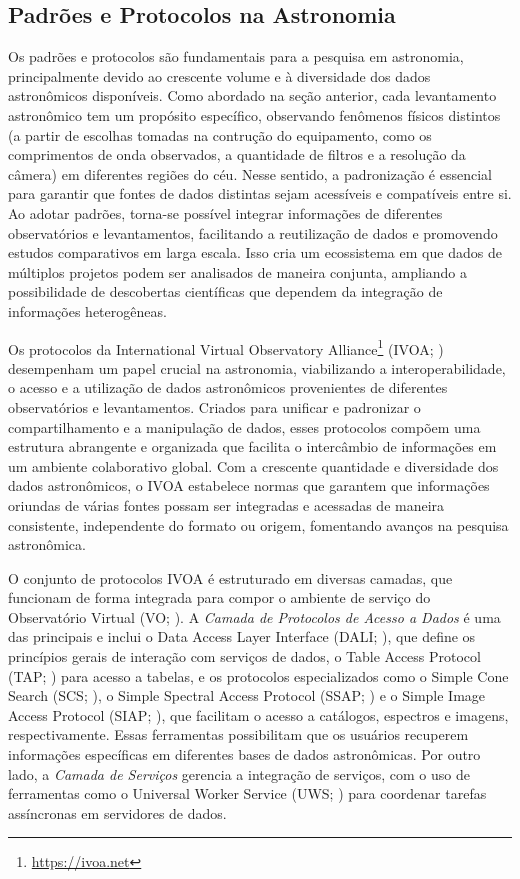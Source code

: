 \subsection{Padrões e Protocolos na Astronomia}
\label{sec:protocolos}

Os padrões e protocolos são fundamentais para a pesquisa em astronomia, principalmente devido ao crescente volume e à diversidade dos dados astronômicos disponíveis. Como abordado na seção anterior, cada levantamento astronômico tem um propósito específico, observando fenômenos físicos distintos (a partir de escolhas tomadas na contrução do equipamento, como os comprimentos de onda observados, a quantidade de filtros e a resolução da câmera) em diferentes regiões do céu. Nesse sentido, a padronização é essencial para garantir que  fontes de dados distintas sejam acessíveis e compatíveis entre si. Ao adotar padrões, torna-se possível integrar informações de diferentes observatórios e levantamentos, facilitando a reutilização de dados e promovendo estudos comparativos em larga escala. Isso cria um ecossistema em que dados de múltiplos projetos podem ser analisados de maneira conjunta, ampliando a possibilidade de descobertas científicas que dependem da integração de informações heterogêneas.

Os protocolos da International Virtual Observatory Alliance\footnote{\url{https://ivoa.net}} (IVOA; \citealp{ivoa}) desempenham um papel crucial na astronomia, viabilizando a interoperabilidade, o acesso e a utilização de dados astronômicos provenientes de diferentes observatórios e levantamentos. Criados para unificar e padronizar o compartilhamento e a manipulação de dados, esses protocolos compõem uma estrutura abrangente e organizada que facilita o intercâmbio de informações em um ambiente colaborativo global. Com a crescente quantidade e diversidade dos dados astronômicos, o IVOA estabelece normas que garantem que informações oriundas de várias fontes possam ser integradas e acessadas de maneira consistente, independente do formato ou origem, fomentando avanços na pesquisa astronômica.

O conjunto de protocolos IVOA é estruturado em diversas camadas, que funcionam de forma integrada para compor o ambiente de serviço do Observatório Virtual (VO; \citealp{voarch}). A \emph{Camada de Protocolos de Acesso a Dados} é uma das principais e inclui o Data Access Layer Interface (DALI; \citealp{dali}), que define os princípios gerais de interação com serviços de dados, o Table Access Protocol (TAP; \citealp{tap}) para acesso a tabelas, e os protocolos especializados como o Simple Cone Search (SCS; \citealp{scs}), o Simple Spectral Access Protocol (SSAP; \citealp{ssa}) e o Simple Image Access Protocol (SIAP; \citealp{siap}), que facilitam o acesso a catálogos, espectros e imagens, respectivamente. Essas ferramentas possibilitam que os usuários recuperem informações específicas em diferentes bases de dados astronômicas. Por outro lado, a \emph{Camada de Serviços} gerencia a integração de serviços, com o uso de ferramentas como o Universal Worker Service (UWS; \citealp{uws}) para coordenar tarefas assíncronas em servidores de dados.


